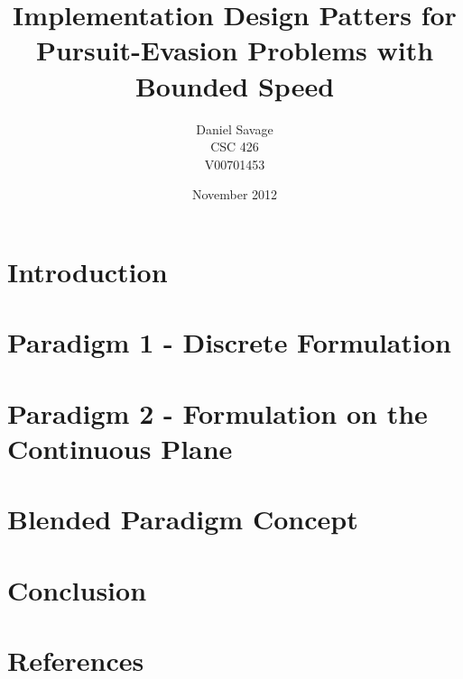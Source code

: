 \documentclass{article}
\begin{document}
\title{Implementation Design Patters for Pursuit-Evasion Problems with Bounded Speed}
\author{Daniel Savage\\CSC 426\\{V00701453}}
\date{November 2012}
\maketitle
\pagebreak

\section{Introduction}

\section{Paradigm 1 - Discrete Formulation}

\section{Paradigm 2 - Formulation on the Continuous Plane}

\section{Blended Paradigm Concept}

\section{Conclusion}

\section{References}
\end{document}
